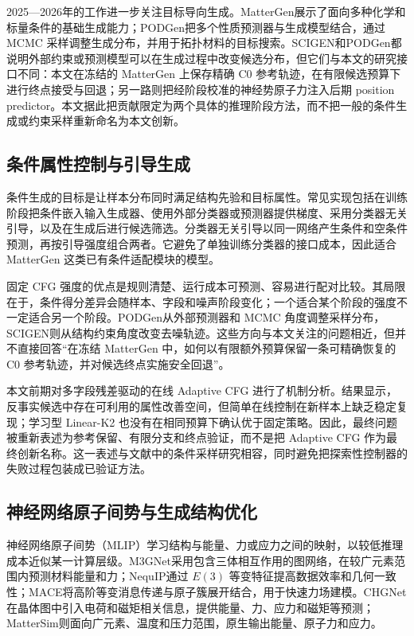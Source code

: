 2025---2026年的工作进一步关注目标导向生成。MatterGen展示了面向多种化学和标量条件的基础生成能力\citep{zeni2025}；PODGen把多个性质预测器与生成模型结合，通过 MCMC 采样调整生成分布，并用于拓扑材料的目标搜索\citep{ye2026}。SCIGEN和PODGen都说明外部约束或预测模型可以在生成过程中改变候选分布，但它们与本文的研究接口不同：本文在冻结的 MatterGen 上保存精确 C0 参考轨迹，在有限候选预算下进行终点接受与回退；另一路则把经阶段校准的神经势原子力注入后期 position predictor。本文据此把贡献限定为两个具体的推理阶段方法，而不把一般的条件生成或约束采样重新命名为本文创新。

\subsection{条件属性控制与引导生成}

条件生成的目标是让样本分布同时满足结构先验和目标属性。常见实现包括在训练阶段把条件嵌入输入生成器、使用外部分类器或预测器提供梯度、采用分类器无关引导，以及在生成后进行候选筛选。分类器无关引导以同一网络产生条件和空条件预测，再按引导强度组合两者\citep{ho2022}。它避免了单独训练分类器的接口成本，因此适合 MatterGen 这类已有条件适配模块的模型。

固定 CFG 强度的优点是规则清楚、运行成本可预测、容易进行配对比较。其局限在于，条件得分差异会随样本、字段和噪声阶段变化；一个适合某个阶段的强度不一定适合另一个阶段。PODGen从外部预测器和 MCMC 角度调整采样分布，SCIGEN则从结构约束角度改变去噪轨迹\citep{okabe2025,ye2026}。这些方向与本文关注的问题相近，但并不直接回答``在冻结 MatterGen 中，如何以有限额外预算保留一条可精确恢复的 C0 参考轨迹，并对候选终点实施安全回退''。

本文前期对多字段残差驱动的在线 Adaptive CFG 进行了机制分析。结果显示，反事实候选中存在可利用的属性改善空间，但简单在线控制在新样本上缺乏稳定复现；学习型 Linear-K2 也没有在相同预算下确认优于固定策略。因此，最终问题被重新表述为参考保留、有限分支和终点验证，而不是把 Adaptive CFG 作为最终创新名称。这一表述与文献中的条件采样研究相容，同时避免把探索性控制器的失败过程包装成已验证方法。

\subsection{神经网络原子间势与生成结构优化}

神经网络原子间势（MLIP）学习结构与能量、力或应力之间的映射，以较低推理成本近似某一计算层级。M3GNet采用包含三体相互作用的图网络，在较广元素范围内预测材料能量和力\citep{chen2022}；NequIP通过 \(E(3)\) 等变特征提高数据效率和几何一致性\citep{batzner2022}；MACE将高阶等变消息传递与原子簇展开结合，用于快速力场建模\citep{batatia2022}。CHGNet在晶体图中引入电荷和磁矩相关信息，提供能量、力、应力和磁矩等预测\citep{deng2023}；Matter\allowbreak Sim则面向广元素、温度和压力范围，原生输出能量、原子力和应力\citep{yang2024mattersim}。

